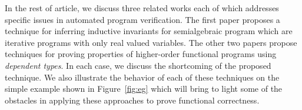 In the rest of article, we discuss three related works each of which addresses specific issues in
automated program verification. The first paper proposes a technique for inferring inductive invariants
for semialgebraic program which are iterative programs with only real valued variables. The other two 
papers propose techniques for proving properties of higher-order functional programs using \emph{dependent types}.
In each case, we discuss the shortcoming of the proposed technique. 
We also illustrate the behavior of each of these techniques on the simple example shown 
in Figure~\ref{fig:eg} which will bring to light some of the obstacles 
in applying these approaches to prove functional correctness.